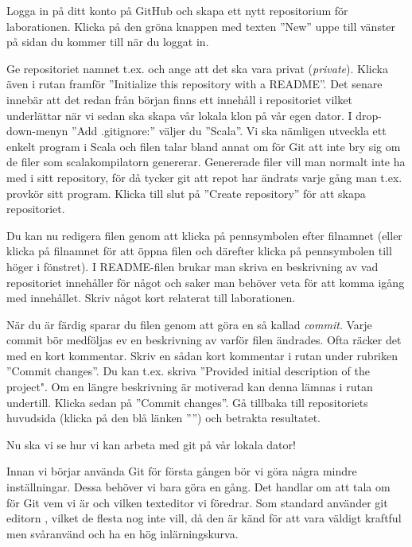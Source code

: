\begin{Datorarbete}

\item Logga in på ditt konto på GitHub och skapa ett nytt repositorium för laborationen. Klicka på den gröna knappen med texten ''New'' uppe till vänster på sidan du kommer till när du loggat in.

Ge repositoriet namnet t.ex. \code{\reponame} och ange att det ska vara privat (\emph{private}). Klicka även i rutan framför ''Initialize this repository with a README''. Det senare innebär att det redan från början finns ett innehåll i repositoriet vilket underlättar när vi sedan ska skapa vår lokala klon på vår egen dator. I drop-down-menyn ''Add .gitignore:'' väljer du ''Scala''. Vi ska nämligen utveckla ett enkelt program i Scala och filen  talar bland annat om för Git att inte bry sig om de filer som scalakompilatorn genererar. Genererade filer vill man normalt inte ha med i sitt repository, för då tycker git att repot har ändrats varje gång man t.ex. provkör sitt program. Klicka till slut på ''Create repository'' för att skapa repositoriet.

Du kan nu redigera filen  genom att klicka på pennsymbolen efter filnamnet (eller klicka på filnamnet för att öppna filen och därefter klicka på pennsymbolen till höger i fönstret). I README-filen brukar man skriva en beskrivning av vad repositoriet innehåller för något och saker man behöver veta för att komma igång med innehållet. Skriv något kort relaterat till laborationen.

När du är färdig sparar du filen genom att göra en så kallad \emph{commit}. Varje commit bör medföljas ev en beskrivning av varför filen ändrades. Ofta räcker det med en kort kommentar. Skriv en sådan kort kommentar i rutan under rubriken ''Commit changes''. Du kan t.ex. skriva ''Provided initial description of the project". Om en längre beskrivning är motiverad kan denna lämnas i rutan undertill. Klicka sedan på ''Commit changes''. Gå tillbaka till repositoriets huvudsida (klicka på den blå länken ''\reponame'') och betrakta resultatet.

Nu ska vi se hur vi kan arbeta med git på vår lokala dator!

\item Innan vi börjar använda Git för första gången bör vi göra några mindre inställningar. Dessa behöver vi bara göra en gång. Det handlar om att tala om för Git vem vi är och vilken texteditor vi föredrar. Som standard använder git editorn , vilket de flesta nog inte vill, då den är känd för att vara väldigt kraftful men svåranvänd och ha en hög inlärningskurva.
\\


\end{Datorarbete}

